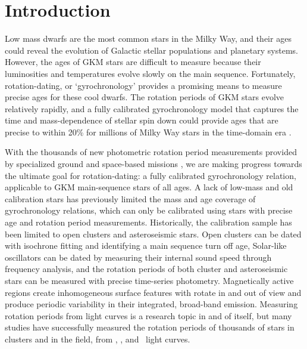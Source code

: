 \section{Introduction}

Low mass dwarfs are the most common stars in the Milky Way, and their ages
could reveal the evolution of Galactic stellar populations and planetary
systems.
However, the ages of GKM stars are difficult to measure because their
luminosities and temperatures evolve slowly on the main sequence.
Fortunately, rotation-dating, or `gyrochronology’ provides a promising means
to measure precise ages for these cool dwarfs.
The rotation periods of GKM stars evolve relatively rapidly, and a fully
calibrated gyrochronology model that captures the time and mass-dependence of
stellar spin down could provide ages that are precise to within 20\% for
millions of Milky Way stars in the time-domain era \citep{epstein2014,
najita2016, angus2019}.

With the thousands of new photometric rotation period measurements provided by
specialized ground and space-based missions \citep[particularly \kepler/\ktwo\
and \tess][]{borucki2010, howell2014, ricker2015}, we are making progress
towards the ultimate goal for rotation-dating: a fully calibrated
gyrochronology relation, applicable to GKM main-sequence stars of all ages.
A lack of low-mass and old calibration stars has previously limited the mass
and age coverage of gyrochronology relations, which can only be calibrated
using stars with precise age and rotation period measurements.
Historically, the calibration sample has been limited to open clusters and
asteroseismic stars.
Open clusters can be dated with isochrone fitting and identifying a main
sequence turn off age, Solar-like oscillators can be dated by measuring their
internal sound speed through frequency analysis, and the rotation periods of
both cluster and asteroseismic stars can be measured with precise time-series
photometry.
Magnetically active regions create inhomogeneous surface features with rotate
in and out of view and produce periodic variability in their integrated,
broad-band emission.
Measuring rotation periods from light curves is a research topic in and of
itself, but many studies have successfully measured the rotation periods of
thousands of stars in clusters and in the field, from \kepler, \ktwo, and
\tess\ light curves.

